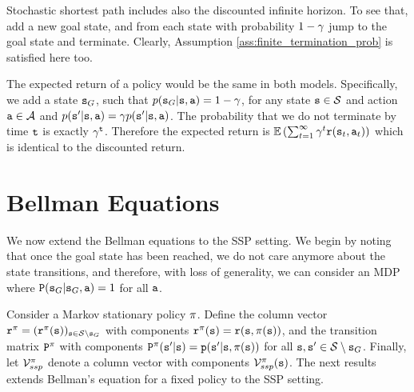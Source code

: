 Stochastic shortest path includes also the discounted infinite
horizon. To see that, add a new goal state, and from each state with
probability $1-\gamma$ jump to the goal state and terminate. Clearly, Assumption \ref{ass:finite_termination_prob} is satisfied here too. 

The expected return of a policy would be the same in both models.
Specifically, we add a state ${\tt s}_G$, such that
$p({\tt s}_G|{\tt s},{\tt a})=1-\gamma$, for any state
${\tt s}\in\mathcal{S}$ and action ${\tt a}\in\mathcal{A}$ and
$p({\tt s}'|{\tt s},{\tt a})=\gamma p({\tt s}'|{\tt s},{\tt a})$. The
probability that we do not terminate by time ${\tt t}$ is exactly
$\gamma^{\tt t}$. Therefore the expected return is
$\mathbb{E}\left(\sum_{t=1}^\infty \gamma^t{\tt r}({\tt s}_t,{\tt a}_t)\right)$ which is
identical to the discounted return.





\section{Bellman Equations}

We now extend the Bellman equations to the SSP setting. We begin by noting that once the goal state has been reached, we do not care anymore about the state transitions, and therefore, with loss of generality, we can consider an MDP where ${\tt P}({\tt s}_G|{\tt s}_G,{\tt a}) = 1$ for all ${\tt a}$. 

Consider a Markov stationary policy $\pi$. Define the column vector ${{\tt r}^\pi } =
{({{\tt r}^\pi }({\tt s}))_{{\tt s} \in \mathcal{S} \setminus {\tt s}_G}}$ with components
${{\tt r}^\pi }({\tt s}) = {\tt r}({\tt s},\pi ({\tt s}))$, and the
transition matrix ${{\tt P}^\pi }$ with components ${{\tt P}^\pi
}({\tt s}'|{\tt s}) = {\tt p}({\tt s}'|{\tt s},\pi ({\tt s}))$ for all ${\tt s},{\tt s}' \in \mathcal{S} \setminus {\tt s}_G$. Finally,
let ${\mathcal{V}_{ssp}^\pi }$ denote a column vector with components
${\mathcal{V}_{ssp}^\pi }({\tt s})$. The next results extends Bellman's equation for a fixed policy to the SSP setting.




